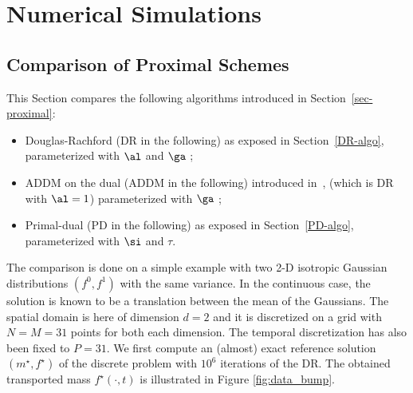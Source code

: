 \section{Numerical Simulations}


\subsection{Comparison of Proximal Schemes}

This Section compares the following algorithms introduced in Section~\ref{sec-proximal}:\vspace{-0.1cm}
\begin{itemize} 
	\item Douglas-Rachford (DR in the following) as exposed in Section~\ref{DR-algo}, parameterized with $\al$ and $\ga$ ;
	\item ADDM on the dual (ADDM in the following) introduced in~\cite{Benamou2000}, (which is DR with $\al=1$) parameterized with $\ga$ ; 
	\item Primal-dual (PD in the following) as exposed in Section~\ref{PD-algo}, parameterized with $\si$ and $\tau$.\vspace{-0.1cm}
\end{itemize}

The comparison is done on a simple example with two 2-D isotropic Gaussian distributions $(f^0,f^1)$ with the same variance. In the continuous case, the solution is known to be a translation between the mean of the Gaussians. The spatial domain is here of dimension $d=2$ and it is discretized on a grid with $N=M=31$ points for both each dimension. The temporal  discretization has also been fixed to $P=31$. We first compute an (almost) exact reference solution $(m^\star,f^\star)$ of the discrete problem with $10^6$ iterations of the DR. The obtained transported mass $f^\star(\cdot,t)$ is illustrated in Figure \ref{fig:data_bump}.

